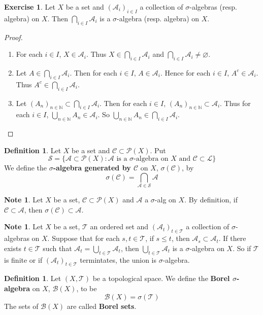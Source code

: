 \documentclass[12pt]{amsart}
\theoremstyle{definition}
\newtheorem{defn}[definition]{Definition}
\newtheorem{note}[definition]{Note}
\newtheorem{ex}[definition]{Exercise}
\newcommand{\sig}{\sigma}
\newcommand{\N}{\mathbb{N}}
\newcommand{\MA}{\mathcal{A}}
\newcommand{\MC}{\mathcal{C}}
\newcommand{\MB}{\mathcal{B}}
\newcommand{\ML}{\mathcal{L}}
\newcommand{\MS}{\mathcal{S}}
\newcommand{\MP}{\mathcal{P}}
\newcommand{\MT}{\mathcal{T}}
\begin{document}
	\begin{ex}
		Let $X$ be a set and $(\MA_i)_{i \in I}$ a collection of $\sig$-algebras (resp. algebra) on $X$. Then $\bigcap\limits_{i \in I}\MA_i$ is a $\sig$-algebra (resp. algebra) on $X$.
	\end{ex}
	
	\begin{proof}\
		\begin{enumerate}
			\item For each $i \in I$, $X \in \MA_i$. Thus $X \in \bigcap\limits_{i \in I}\MA_i$ and $\bigcap\limits_{i \in I}\MA_i \neq \varnothing$.
			\item Let $A \in \bigcap\limits_{i \in I}\MA_i$. Then for each $i \in I$, $A \in \MA_i$. Hence for each $i \in I$, $A^c \in \MA_i$. Thus $A^c \in \bigcap\limits_{i \in I}\MA_i$. 
			\item Let $(A_n)_{n \in \N} \subset \bigcap\limits_{i \in I}\MA_i$. Then for each $i \in I$, $(A_n)_{n \in \N} \subset \MA_i$. Thus for each $i \in I$, $\bigcup\limits_{n \in \N}A_n \in \MA_i$. So $\bigcup\limits_{n \in \N}A_n \in \bigcap\limits_{i \in I}\MA_i$.
		\end{enumerate}
	\end{proof}
	
	\begin{defn}
		Let $X$ be a set and $\MC \subset \MP(X)$. Put $$\MS = \{\MA \subset \MP(X): \MA \text{ is a }\sig\text{-algebra on }X \text{ and } \MC \subset \ML\}$$ We define the \textbf{$\sig$-algebra generated by $\MC$} on $X$, $\sig(\MC)$, by $$\sig(\MC) = \bigcap_{\MA \in \MS} \MA $$
	\end{defn}
	
	\begin{note}
		Let $X$ be a set, $\MC \subset \MP(X)$ and $\MA$ a $\sig$-alg on $X$. By definition, if $\MC \subset \MA$, then $\sig(\MC) \subset \MA$.
	\end{note}
	
	\begin{note}
		Let $X$ be a set, $\MT$ an ordered set and $(\MA_t)_{t\in \MT}$ a collection of $\sig$-algebras on $X$. Suppose that for each $s,t \in \MT$, if $s \leq t$, then $\MA_s \subset \MA_t$. If there exists $t \in \MT$ such that $\MA_t = \bigcup\limits_{t \in \MT}\MA_t$, then $\bigcup\limits_{t \in \MT}\MA_t$ is a $\sig$-algebra on $X$. So if $\MT$ is finite or if $(\MA_t)_{t \in \MT}$ termintates, the union is $\sig$-algebra.
	\end{note}
	
	\begin{defn}
		Let $(X,\MT)$ be a topological space. We define the \textbf{Borel $\sig$-algebra} on $X$, $\MB(X)$, to be  $$\MB(X) = \sig(\MT)$$ The sets of $\MB(X)$ are called \textbf{Borel sets}.
	\end{defn}
	
\end{document}
